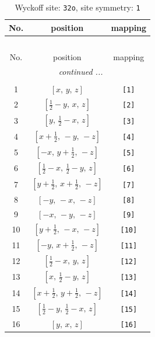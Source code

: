 \documentclass[fleqn,8pt]{jsarticle}
\begin{document}
\renewcommand{\arraystretch}{1.2}
\begin{longtable}{ccc}
\caption{Wyckoff site: {\tt 32o}, site symmetry: {\tt 1}}
 \\
 \hline \hline
No. & position & mapping \\ \hline \endfirsthead

\multicolumn{2}{l}{\tablename\ \thetable{}} \\
 \hline \hline
No. & position & mapping \\ \hline \endhead

 \hline \hline
\multicolumn{2}{r}{\footnotesize\it continued ...} \\ \endfoot

 \hline \hline
\multicolumn{2}{r}{} \\ \endlastfoot

1 & $\left[ x,\, y,\, z \right]$ & {\tt [1]} \\ \hline
2 & $\left[ \frac{1}{2} - y,\, x,\, z \right]$ & {\tt [2]} \\ \hline
3 & $\left[ y,\, \frac{1}{2} - x,\, z \right]$ & {\tt [3]} \\ \hline
4 & $\left[ x + \frac{1}{2},\, - y,\, - z \right]$ & {\tt [4]} \\ \hline
5 & $\left[ - x,\, y + \frac{1}{2},\, - z \right]$ & {\tt [5]} \\ \hline
6 & $\left[ \frac{1}{2} - x,\, \frac{1}{2} - y,\, z \right]$ & {\tt [6]} \\ \hline
7 & $\left[ y + \frac{1}{2},\, x + \frac{1}{2},\, - z \right]$ & {\tt [7]} \\ \hline
8 & $\left[ - y,\, - x,\, - z \right]$ & {\tt [8]} \\ \hline
9 & $\left[ - x,\, - y,\, - z \right]$ & {\tt [9]} \\ \hline
10 & $\left[ y + \frac{1}{2},\, - x,\, - z \right]$ & {\tt [10]} \\ \hline
11 & $\left[ - y,\, x + \frac{1}{2},\, - z \right]$ & {\tt [11]} \\ \hline
12 & $\left[ \frac{1}{2} - x,\, y,\, z \right]$ & {\tt [12]} \\ \hline
13 & $\left[ x,\, \frac{1}{2} - y,\, z \right]$ & {\tt [13]} \\ \hline
14 & $\left[ x + \frac{1}{2},\, y + \frac{1}{2},\, - z \right]$ & {\tt [14]} \\ \hline
15 & $\left[ \frac{1}{2} - y,\, \frac{1}{2} - x,\, z \right]$ & {\tt [15]} \\ \hline
16 & $\left[ y,\, x,\, z \right]$ & {\tt [16]} \\ \hline

\end{longtable}
\end{document}
